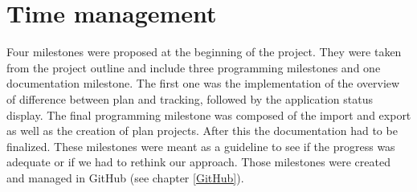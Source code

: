 \section{Time management} \label{Time management}
Four milestones were proposed at the beginning of the project. They were taken from the project outline and include three programming milestones and one documentation milestone. The first one was the implementation of the overview of difference between plan and tracking, followed by the application status display. The final programming milestone was composed of the import and export as well as the creation of plan projects. After this the documentation had to be finalized. These milestones were meant as a guideline to see if the progress was adequate or if we had to rethink our approach. Those milestones were created and managed in GitHub (see chapter \ref{GitHub}). 



